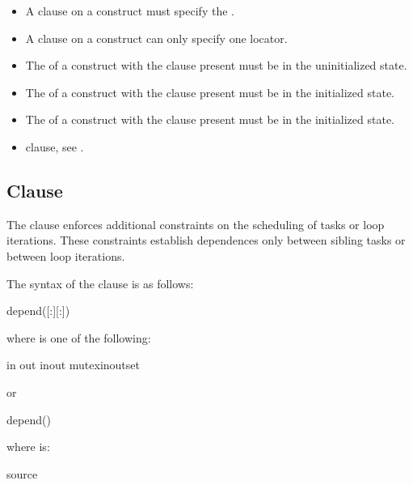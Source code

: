 \restrictions
\begin{itemize}
 \item A  clause on a  construct must specify the .
 \item A  clause on a  construct can only specify one locator.
 \item The  of a  construct with the  clause present must be in the uninitialized state.
 \item The  of a  construct with the  clause present must be in the initialized state.
 \item The  of a  construct with the  clause present must be in the initialized state. 
\end{itemize}

\crossreferences
\begin{itemize}
 \item {} clause, see .
\end{itemize}

\subsection{ Clause}
\label{subsec:depend Clause}
\summary
The  clause enforces additional constraints on the scheduling of tasks or loop iterations.  These
constraints establish dependences only between sibling tasks or between loop iterations.

\syntax
The syntax of the  clause is as follows:

\begin{ompSyntax}
depend([:][:])
\end{ompSyntax}

where  is one of the following:
\begin{indentedcodelist}
in
out
inout
mutexinoutset
\end{indentedcodelist}

or

\begin{ompSyntax}
depend()
\end{ompSyntax}

where  is:
\begin{indentedcodelist}
source
\end{indentedcodelist}

